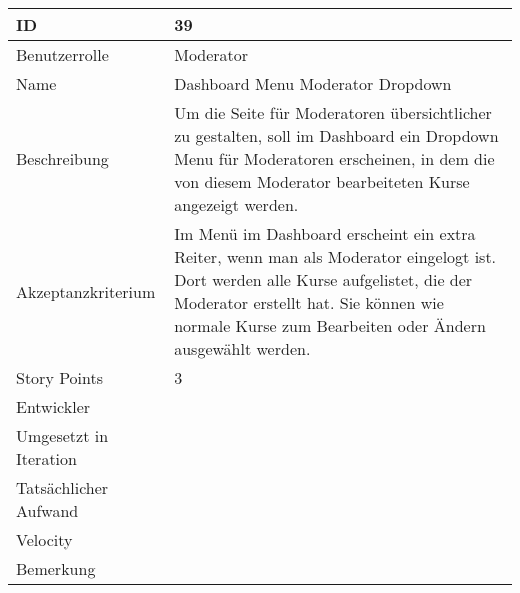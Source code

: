 \begin{tabularx}{\textwidth}{|p{}|X|}
	\hline
	ID & 39 \\
	\hline
	Benutzerrolle & Moderator \\
	\hline
	Name & Dashboard Menu Moderator Dropdown\\
	\hline
	Beschreibung & Um die Seite für Moderatoren übersichtlicher zu gestalten, soll im Dashboard ein Dropdown Menu für Moderatoren erscheinen, in dem die von diesem Moderator bearbeiteten Kurse angezeigt werden. \\
	\hline
	Akzeptanzkriterium & Im Menü im Dashboard erscheint ein extra Reiter, wenn man als Moderator eingelogt ist. Dort werden alle Kurse aufgelistet, die der Moderator erstellt hat. Sie können wie normale Kurse zum Bearbeiten oder Ändern ausgewählt werden. \\
	\hline
	Story Points & 3\\
	\hline
	Entwickler & \\
	\hline
	Umgesetzt in Iteration & \\
	\hline
	Tatsächlicher Aufwand & \\
	\hline
	Velocity & \\
	\hline
	Bemerkung & \\
	\hline
\end{tabularx}
\vspace{20pt}
